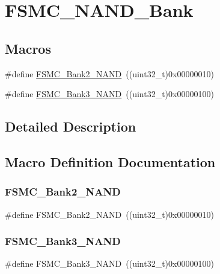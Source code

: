 \hypertarget{group___f_s_m_c___n_a_n_d___bank}{}\section{F\+S\+M\+C\+\_\+\+N\+A\+N\+D\+\_\+\+Bank}
\label{group___f_s_m_c___n_a_n_d___bank}
\subsection*{Macros}
\begin{DoxyCompactItemize}
\item 
\#define \mbox{\hyperlink{group___f_s_m_c___n_a_n_d___bank_ga294e7134aa329a09e56b61eec9882a27}{F\+S\+M\+C\+\_\+\+Bank2\+\_\+\+N\+A\+ND}}~((uint32\+\_\+t)0x00000010)
\item 
\#define \mbox{\hyperlink{group___f_s_m_c___n_a_n_d___bank_gaf72def0732c026b0245d721ee371c85b}{F\+S\+M\+C\+\_\+\+Bank3\+\_\+\+N\+A\+ND}}~((uint32\+\_\+t)0x00000100)
\end{DoxyCompactItemize}


\subsection{Detailed Description}


\subsection{Macro Definition Documentation}
\mbox{\label{group___f_s_m_c___n_a_n_d___bank_ga294e7134aa329a09e56b61eec9882a27}} 
\subsubsection{\texorpdfstring{FSMC\_Bank2\_NAND}{FSMC\_Bank2\_NAND}}
{\footnotesize\ttfamily \#define F\+S\+M\+C\+\_\+\+Bank2\+\_\+\+N\+A\+ND~((uint32\+\_\+t)0x00000010)}

\mbox{\label{group___f_s_m_c___n_a_n_d___bank_gaf72def0732c026b0245d721ee371c85b}} 
\subsubsection{\texorpdfstring{FSMC\_Bank3\_NAND}{FSMC\_Bank3\_NAND}}
{\footnotesize\ttfamily \#define F\+S\+M\+C\+\_\+\+Bank3\+\_\+\+N\+A\+ND~((uint32\+\_\+t)0x00000100)}

